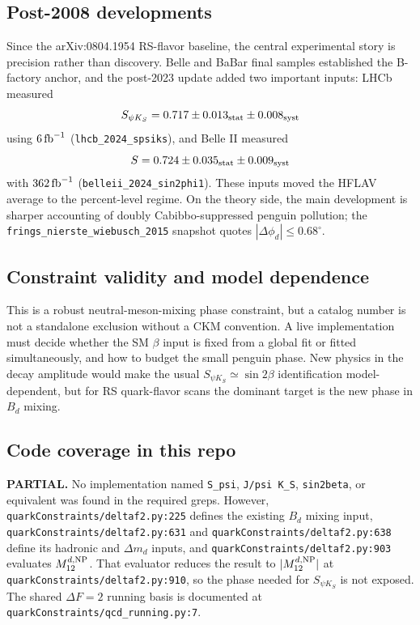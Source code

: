\subsection*{Post-2008 developments}
Since the arXiv:0804.1954 RS-flavor baseline, the central experimental story
is precision rather than discovery.  Belle and BaBar final samples established
the B-factory anchor, and the post-2023 update added two important inputs:
LHCb measured
\[
  S_{\psi K_S}=0.717\pm0.013_{\rm stat}\pm0.008_{\rm syst}
\]
using \(6\,{\rm fb}^{-1}\)
(\texttt{lhcb\_2024\_spsiks}), and Belle II measured
\[
  S=0.724\pm0.035_{\rm stat}\pm0.009_{\rm syst}
\]
with \(362\,{\rm fb}^{-1}\)
(\texttt{belleii\_2024\_sin2phi1}).  These inputs moved the HFLAV average to
the percent-level regime.  On the theory side, the main development is sharper
accounting of doubly Cabibbo-suppressed penguin pollution; the
\texttt{frings\_nierste\_wiebusch\_2015} snapshot quotes
\(|\Delta\phi_d|\le 0.68^\circ\).

\subsection*{Constraint validity and model dependence}
This is a robust neutral-meson-mixing phase constraint, but a catalog number
is not a standalone exclusion without a CKM convention.  A live implementation
must decide whether the SM \(\beta\) input is fixed from a global fit or fitted
simultaneously, and how to budget the small penguin phase.  New physics in the
decay amplitude would make the usual \(S_{\psi K_S}\simeq \sin 2\beta\)
identification model-dependent, but for RS quark-flavor scans the dominant
target is the new phase in \(B_d\) mixing.

\subsection*{Code coverage in this repo}
\textbf{PARTIAL.}  No implementation named \texttt{S\_psi}, \texttt{J/psi K\_S},
\texttt{sin2beta}, or equivalent was found in the required greps.  However,
\texttt{quarkConstraints/deltaf2.py:225} defines the existing \(B_d\) mixing
input, \texttt{quarkConstraints/deltaf2.py:631} and
\texttt{quarkConstraints/deltaf2.py:638} define its hadronic and
\(\Delta m_d\) inputs, and
\texttt{quarkConstraints/deltaf2.py:903} evaluates \(M_{12}^{d,\rm NP}\).
That evaluator reduces the result to \(\lvert M_{12}^{d,\rm NP}\rvert\) at
\texttt{quarkConstraints/deltaf2.py:910}, so the phase needed for
\(S_{\psi K_S}\) is not exposed.  The shared \(\Delta F=2\) running basis is
documented at \texttt{quarkConstraints/qcd\_running.py:7}.


